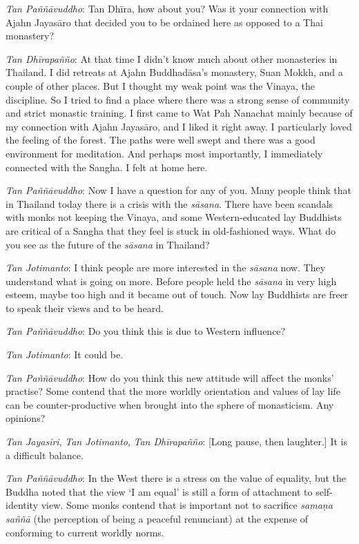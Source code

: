 \emph{Tan Paññāvuddho}: Tan Dhīra, how about you? Was it your
connection with Ajahn Jayasāro that decided you to be ordained here as
opposed to a Thai monastery? 

\emph{Tan Dhīrapañño}: At that time I didn't know much about other
monasteries in Thailand. I did retreats at Ajahn Buddhadāsa's monastery, 
Suan Mokkh, and a couple of other places. But I thought my weak point
was the Vinaya, the discipline. So I tried to find a place where there
was a strong sense of community and strict monastic training. I first
came to Wat Pah Nanachat mainly because of my connection with Ajahn
Jayasāro, and I liked it right away. I particularly loved the feeling of
the forest. The paths were well swept and there was a good environment
for meditation. And perhaps most importantly, I immediately connected
with the Sangha. I felt at home here. 

\emph{Tan Paññāvuddho}: Now I have a question for any of you. Many
people think that in Thailand today there is a crisis with the
\emph{sāsana}. There have been scandals with monks not keeping the
Vinaya, and some Western-educated lay Buddhists are critical of a Sangha
that they feel is stuck in old-fashioned ways. What do you see as the
future of the \emph{sāsana} in Thailand? 

\emph{Tan Jotimanto}: I think people are more interested in the
\emph{sāsana} now. They understand what is going on more. Before people
held the \emph{sāsana} in very high esteem, maybe too high and it became
out of touch. Now lay Buddhists are freer to speak their views and to be
heard. 

\emph{Tan Paññāvuddho}: Do you think this is due to Western influence? 

\emph{Tan Jotimanto}: It could be. 

\emph{Tan Paññāvuddho}: How do you think this new attitude will affect
the monks' practise? Some contend that the more worldly orientation and
values of lay life can be counter-productive when brought into the
sphere of monasticism. Any opinions? 

\emph{Tan Jayasiri}, \emph{Tan Jotimanto}, \emph{Tan Dhīrapañño}:
[Long pause, then laughter.] It is a difficult balance.

\emph{Tan Paññāvuddho}: In the West there is a stress on the value of
equality, but the Buddha noted that the view `I am equal' is still a
form of attachment to self-identity view. Some monks contend that is
important not to sacrifice \emph{samaṇa saññā} (the perception of being
a peaceful renunciant) at the expense of conforming to current worldly
norms. 

